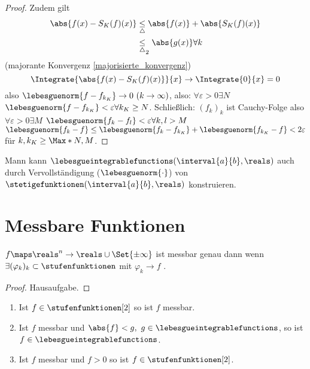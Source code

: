 \begin{proof}
    Zudem gilt 
    \begin{align*}
        \abs{f(x)-S_K(f)(x)}&\underset{\triangle}{\leq}\abs{f(x)}+\abs{S_K(f)(x)}\\
        &\underset{\triangle}{\leq}_2\abs{g(x)} \forall k
    \end{align*}
    \timplies (majorante Konvergenz \ref{majorisierte_konvergenz})
    \begin{equation*}
        \Integrate{\abs{f(x)-S_K(f)(x)}}{x}\to\Integrate{ 0}{x}=0
    \end{equation*}
    also \(\lebesguenorm{f-f_{k_K}}\to 0\ (k\to\infty)\), also: \(\forall\varepsilon>0\exists N\) \sd \(\lebesguenorm{f-f_{k_K}}<\varepsilon\forall k_K\geq  N\).
    Schließlich: \((f_k)_k\) ist Cauchy-Folge also \(\forall\varepsilon>0\exists M\) \sd \(\lebesguenorm{f_k-f_l}<\varepsilon\forall k,l> M\)\\
    \timplies \(\lebesguenorm{f_k-f}\leq \lebesguenorm{f_k-f_{k_K}}+\lebesguenorm{f_{k_K}-f}<2\varepsilon\) für \(k,k_K\geq \Max*{N,M}\).
\end{proof}

Mann kann \(\lebesgueintegrablefunctions(\interval{a}{b},\reals)\) auch durch Vervollständigung (\bzgl \(\lebesguenorm{\cdot}\)) von \(\stetigefunktionen(\interval{a}{b},\reals)\) konstruieren.


\section{Messbare  Funktionen}

\begin{lemma}
    \label{grenzwert_von_treppenfunktionen_ist_messbar} %
    \(f\maps\reals^n\to\reals\cup\Set{\pm\infty}\) ist messbar genau dann wenn \(\exists (\varphi_k)_k\subset \stufenfunktionen\) mit \(\varphi_k\to f\) \fue.
\end{lemma}

\begin{proof}
    Hausaufgabe.
\end{proof}

\begin{lemma}\label{messbar_eigenschaften}

    \begin{enumerate}
        \item \label{r2_messbar}Ist \(f\in\stufenfunktionen[2]\) so ist \(f\) messbar.
        \item \label{beschraenkte_messbare_ist_lebesgue}Ist \(f\) messbar und \(\abs{f}<g,\ g\in \lebesgueintegrablefunctions\), so ist \(f\in \lebesgueintegrablefunctions\).
        \item Ist \(f\) messbar und \(f> 0\) so ist \(f\in\stufenfunktionen[2]\).
    \end{enumerate}
\end{lemma}

